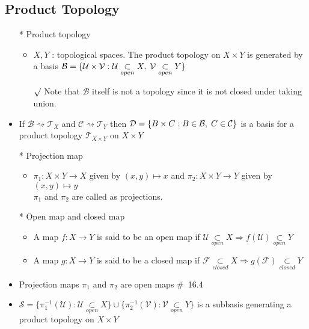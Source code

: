 \documentclass[12pt]{article}
\newcommand{\sptwo}{\hspace{0.2cm}}
\newcommand{\spone}{\hspace{0.1cm}}
\newcommand{\open}{\underset{open}{\subset}}
\newcommand{\closed}{\underset{closed}{\subset}}
\begin{document}
\subsection{Product Topology}
\smallskip
\begin{itemize}
	\item[*] Product topology
	\begin{itemize}
		\item $X,Y$ : topological spaces. The product topology on $X\times Y$ is generated by a basis  $\mathcal{B}=\{\mathcal{U}\times\mathcal{V}: \mathcal{U}\open X,\spone \mathcal{V}\open Y\}$
		\item[$\surd$]Note that $\mathcal{B}$ itself is not a topology since it is not closed under taking union.
	\end{itemize}
	\item If $\mathcal{B}\rightsquigarrow\mathcal{T}_X$ and $\mathcal{C}\rightsquigarrow\mathcal{T}_Y$ then $\mathcal{D}=\{B\times C : B\in \mathcal{B},\spone C\in \mathcal{C}\}$ is a basis for a product topology $\mathcal{T}_{X\times Y}$ on $X\times Y$
	\item[*] Projection map
	\begin{itemize}
		\item $\pi_1 : X\times Y\rightarrow X$ given by $(x,y) \mapsto x$ \sptwo and \sptwo  $\pi_2 : X\times Y\rightarrow Y$ given by $(x,y) \mapsto y$ \\$\pi_1$ and $\pi_2$ are called as projections.
	\end{itemize}
	\item[*] Open map and closed map
	\begin{itemize}
		\item A map $f : X\rightarrow Y$ is said to be an open map if $\mathcal{U}\open X \Rightarrow f(\mathcal{U})\open Y$
		\item A map $g : X\rightarrow Y$ is said to be a closed map if $\mathcal{F}\closed X \Rightarrow g(\mathcal{F})\closed Y$
	\end{itemize}
	\item Projection maps $\pi_1$ and $\pi_2$ are open maps	\quad \#\ 16.4
	\item $\mathcal{S}=\{\pi_1^{-1}(\mathcal{U}):\mathcal{U}\open X\}\cup \{\pi_2^{-1}(\mathcal{V}):\mathcal{V}\open Y\}$ is a subbasis generating a product topology on $X\times Y$
\end{itemize}
\bigskip
\end{document}
